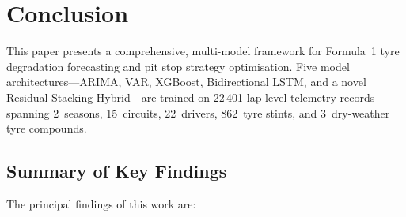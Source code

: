 \documentclass[journal,twoside]{IEEEtran}
\begin{document}
\section{Conclusion}\label{sec:conclusion}

This paper presents a comprehensive, multi-model framework for
Formula~1 tyre degradation forecasting and pit stop strategy
optimisation.  Five model architectures---ARIMA, VAR, XGBoost,
Bidirectional LSTM, and a novel Residual-Stacking Hybrid---are trained
on 22\,401 lap-level telemetry records spanning 2~seasons,
15~circuits, 22~drivers, 862~tyre stints, and 3~dry-weather tyre
compounds.

\subsection{Summary of Key Findings}

The principal findings of this work are:
\end{document}
